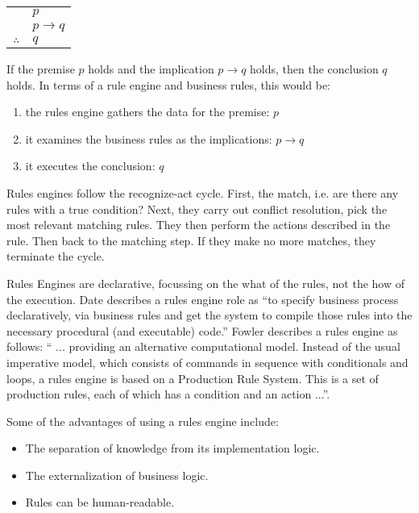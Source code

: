 \begin{tabular}{c@{\,}l@{}} 
    & $p$ \\
\arrayrulecolor{blue!60!green!70}    & $p \to q$ \\\cline{2-2}
$\therefore$         & $q$ \\
\end{tabular}

If the premise $p$ holds and the implication $p \to q$ holds, then the conclusion $q$ holds.
In terms of a rule engine and business rules, this would be:
\begin{enumerate}
    \setlength\itemsep{0em}
    \item the rules engine gathers the data for the premise: $p$
    \item it examines the business rules as the implications: $p \to q$
    \item it executes the conclusion: $q$
\end{enumerate}

Rules engines follow the recognize-act cycle.
First, the match, i.e. are there any rules with a true condition?
Next, they carry out conflict resolution, pick the most relevant matching rules.
They then perform the actions described in the rule.
Then back to the matching step.
If they make no more matches, they terminate the cycle.

Rules Engines are declarative, focussing on the what of the rules, not the how of the execution.
Date\cite{date2000not} describes a rules engine role as ``to specify business process declaratively, via business rules and get the system to compile those rules into the necessary procedural (and executable) code.''
Fowler\cite{Fowler_rulesEngine} describes a rules engine as follows: `` ... providing an alternative computational model.
Instead of the usual imperative model, which consists of commands in sequence with conditionals and loops, a rules engine is based on a Production Rule System.
This is a set of production rules, each of which has a condition and an action ...''.

Some of the advantages of using a rules engine include:
\begin{itemize}
    \setlength\itemsep{0em}
    \item The separation of knowledge from its implementation logic.
    \item The externalization of business logic.
    \item Rules can be human-readable.
\end{itemize}

